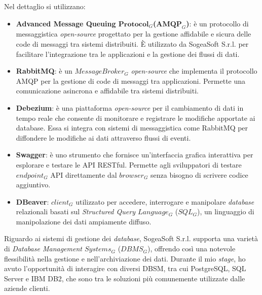     \vspace{1em}
    
    \noindent Nel dettaglio si utilizzano:
    \begin{itemize}
        \item \textbf{Advanced Message Queuing $\textbf{Protocol}_G $($\textbf{AMQP}_G$)}:  è un protocollo di messaggistica \textit{open-source} progettato per la gestione affidabile e sicura delle code di messaggi tra sistemi distribuiti. È utilizzato da SogeaSoft S.r.l. per facilitare l'integrazione tra le applicazioni e la gestione dei flussi di dati.
        
        \item \textbf{RabbitMQ}: è un \textit{$Message Broker_G$} \textit{open-source} che implementa il protocollo AMQP per la gestione di code di messaggi tra applicazioni. Permette una comunicazione asincrona e affidabile tra sistemi distribuiti.

        \item \textbf{Debezium}: è una piattaforma \textit{open-source} per il cambiamento di dati in tempo reale che consente di monitorare e registrare le modifiche apportate ai database. Essa si integra con sistemi di messaggistica come RabbitMQ per diffondere le modifiche ai dati attraverso flussi di eventi.
        
        \item \textbf{Swagger}: è uno strumento che fornisce un'interfaccia grafica interattiva per esplorare e testare le API RESTful. Permette agli sviluppatori di testare \textit{$endpoint_G$} API direttamente dal \textit{$browser_G$} senza bisogno di scrivere codice aggiuntivo.
        
        \item \textbf{DBeaver}: \textit{$client_G$} utilizzato per accedere, interrogare e manipolare \textit{database} relazionali basati sul \textit{Structured Query $Language_G$} ($SQL_G$), un linguaggio di manipolazione dei dati ampiamente diffuso.
    \end{itemize}

    \noindent Riguardo ai sistemi di gestione dei \textit{database}, SogeaSoft S.r.l. supporta una varietà di \textit{Database Management $Systems_G$} ($DBMS_G$), offrendo così una notevole flessibilità nella gestione e nell'archiviazione dei dati. Durante il mio \textit{stage}, ho avuto l'opportunità di interagire con diversi DBSM, tra cui PostgreSQL, SQL Server e IBM DB2, che sono tra le soluzioni più comunemente utilizzate dalle aziende clienti.
    
